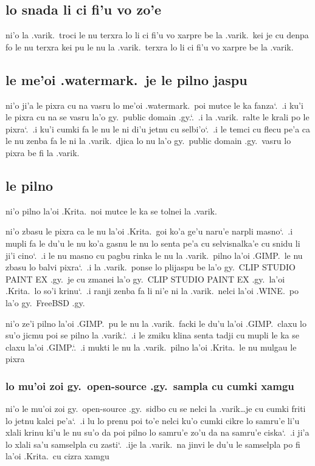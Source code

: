 \documentclass{report}
\newcommand\sds{\spacefactor\sfcode`.\ \space}
\begin{document}
\subsection{lo snada li ci fi'u vo zo'e}
ni'o la .varik.\ troci le nu terxra lo li ci fi'u vo xarpre be la .varik.\ kei je cu denpa fo le nu terxra kei pu le nu la .varik.\ terxra lo li ci fi'u vo xarpre be la .varik.
\subsection{le me'oi .watermark.\ je le pilno jaspu}
ni'o ji'a le pixra cu na vasru lo me'oi .watermark.\ poi mutce le ka fanza\sds  .i ku'i le pixra cu na se vasru la'o gy.\ public domain .gy.\sds  .i la .varik.\ ralte le krali po le pixra\sds  .i ku'i cumki fa le nu le ni di'u jetnu cu selbi'o\sds  .i le temci cu flecu pe'a ca le nu zenba fa le ni la .varik.\ djica lo nu la'o gy.\ public domain .gy.\ vasru lo pixra be fi la .varik.

\subsection{le pilno}
ni'o pilno la'oi .Krita.\ noi mutce le ka se tolnei la .varik.

ni'o zbasu le pixra ca le nu la'oi .Krita.\ goi ko'a ge'u naru'e narpli masno\sds  .i mupli fa le du'u le nu ko'a gasnu le nu lo senta pe'a cu selvisnalka'e cu snidu li ji'i cino\sds  .i le nu masno cu pagbu rinka le nu la .varik.\ pilno la'oi .GIMP.\ le nu zbasu lo balvi pixra\sds  .i la .varik.\ ponse lo plijaspu be la'o gy.\ CLIP STUDIO PAINT EX .gy.\ je cu zmanei la'o gy.\ CLIP STUDIO PAINT EX .gy.\ la'oi .Krita.\ lo so'i krinu\sds  .i ranji zenba fa li ni'e ni la .varik.\ nelci la'oi .WINE.\ po la'o gy.\ FreeBSD .gy.

ni'o ze'i pilno la'oi .GIMP.\ pu le nu la .varik.\ facki le du'u la'oi .GIMP.\ claxu lo su'o jicmu poi se pilno la .varik.\sds  .i le zmiku klina senta tadji cu mupli le ka se claxu la'oi .GIMP.\sds  .i mukti le nu la .varik.\ pilno la'oi .Krita.\ le nu mulgau le pixra

\subsubsection{lo mu'oi zoi gy.\ open-source .gy.\ sampla cu cumki xamgu}
ni'o le mu'oi zoi gy.\ open-source .gy.\ sidbo cu se nelci la .varik\ldots je cu cumki friti lo jetnu kalci pe'a\sds  .i lu lo prenu poi to'e nelci ku'o cumki cikre lo samru'e li'u xlali krinu ki'u le nu su'o da poi pilno lo samru'e zo'u da na samru'e ciska\sds  .i ji'a lo xlali sa'u samselpla cu zasti\sds  .ije la .varik.\ na jinvi le du'u le samselpla po fi la'oi .Krita.\ cu cizra xamgu
\end{document}

